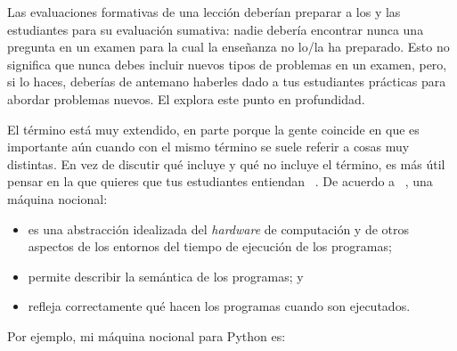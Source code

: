 Las evaluaciones formativas de una lección deberían preparar a los y las estudiantes para su evaluación sumativa:
nadie debería encontrar nunca una pregunta en un examen para la cual la enseñanza no lo/la ha preparado.
Esto no significa que nunca debes incluir nuevos tipos de problemas en un examen, pero, si lo haces,
deberías de antemano haberles dado a tus estudiantes prácticas para abordar problemas nuevos. 
El  explora este punto en profundidad.


El término  está muy extendido,
en parte porque la gente coincide en que es importante aún cuando con el mismo término se suele referir a cosas muy distintas.
En vez de discutir qué incluye y qué no incluye el término,
es más útil pensar en la 
que quieres que tus estudiantes entiendan ~\cite{DuBo1986}.
De acuerdo a ~\cite{Sorv2013},
una máquina nocional:

\begin{itemize}

\item
es una abstracción idealizada del \emph{hardware} de computación  
y de otros aspectos de los entornos del tiempo de ejecución de los programas;

\item
  permite describir la semántica de los programas;
  y

\item
  refleja correctamente qué hacen los programas cuando son ejecutados.

\end{itemize}

\noindent
Por ejemplo, mi máquina nocional para Python es:

